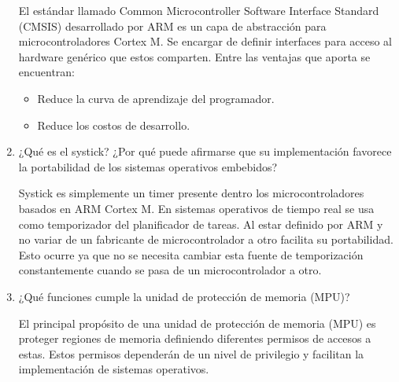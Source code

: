 \documentclass[12pt, a4paper]{article}
\makeatletter
\newcommand\setItemnumber[1]{\setcounter{enum\romannumeral\@enumdepth}{\numexpr#1-1\relax}}
\makeatother
\begin{document}
\begin{enumerate}
    El estándar llamado Common Microcontroller Software Interface Standard (CMSIS) desarrollado por 
    ARM es un capa de abstracción para microcontroladores Cortex M. Se encargar de definir interfaces
    para acceso al hardware genérico que estos comparten. Entre las ventajas que aporta se encuentran:
    
    \begin{itemize}
        \item Reduce la curva de aprendizaje del programador.
        \item Reduce los costos de desarrollo.
    \end{itemize}
    
    \setItemnumber{17}
    \item ¿Qué es el systick? ¿Por qué puede afirmarse que su implementación favorece la portabilidad 
    de los sistemas operativos embebidos?
    
    Systick es simplemente un timer presente dentro los microcontroladores basados en ARM Cortex M. 
    En sistemas operativos de tiempo real se usa como temporizador del planificador de tareas. Al estar
    definido por ARM y no variar de un fabricante de microcontrolador a otro facilita
    su portabilidad. Esto ocurre ya que no se necesita cambiar esta fuente de temporización constantemente 
    cuando se pasa de un microcontrolador a otro.
    
    \setItemnumber{18}
    \item ¿Qué funciones cumple la unidad de protección de memoria (MPU)?
    
    El principal propósito de una unidad de protección de memoria (MPU) es proteger regiones de
    memoria definiendo diferentes permisos de accesos a estas. Estos permisos dependerán de un 
    nivel de privilegio y facilitan la implementación de sistemas operativos.
    
\end{enumerate}
\end{document}
